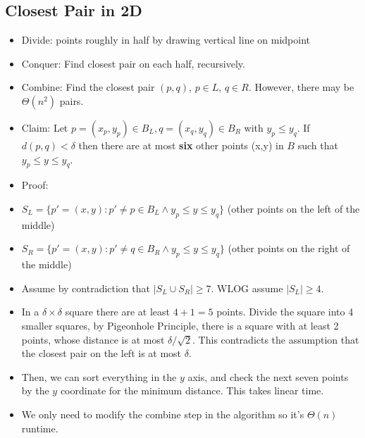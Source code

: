 \documentclass[a4paper]{article}
\begin{document}
\subsection{Closest Pair in 2D}
\begin{itemize}
    \item Divide: points roughly in half by drawing vertical line on midpoint
    \item Conquer: Find closest pair on each half, recursively.
    \item Combine: Find the closest pair $(p,q)$, $p\in L$, $q\in R$. However, there may be $\Theta(n^2)$ pairs.
\end{itemize}
\begin{itemize}
    \item Claim: Let $p=(x_p,y_p)\in B_L,q=(x_q,y_q)\in B_R$ with $y_p\leq y_q$. If $d(p,q)<\delta$ then there are at most \textbf{six} other points (x,y) in $B$ such that $y_p\leq y\leq y_q$.
    \item Proof:
    \item $S_L=\{p'=(x,y):p'\neq p\in B_L\land y_p\leq y\leq y_q\}$ (other points on the left of the middle)
    \item $S_R=\{p'=(x,y):p'\neq q\in B_R\land y_p\leq y\leq y_q\}$ (other points on the right of the middle)
    \item Assume by contradiction that $|S_L\cup S_R|\geq 7$. WLOG assume $|S_L|\geq 4$.
    \item In a $\delta\times\delta$ square there are at least $4+1=5$ points. Divide the square into 4 smaller squares, by Pigeonhole Principle, there is a square with at least 2 points, whose distance is at most $\delta/\sqrt2$. This contradicts the assumption that the closest pair on the left is at most $\delta$.
\end{itemize}
\begin{itemize}
    \item Then, we can sort everything in the $y$ axis, and check the next seven points by the $y$ coordinate for the minimum distance. This takes linear time.
    \item We only need to modify the combine step in the algorithm so it's $\Theta(n)$ runtime.
\end{itemize}
\end{document}
